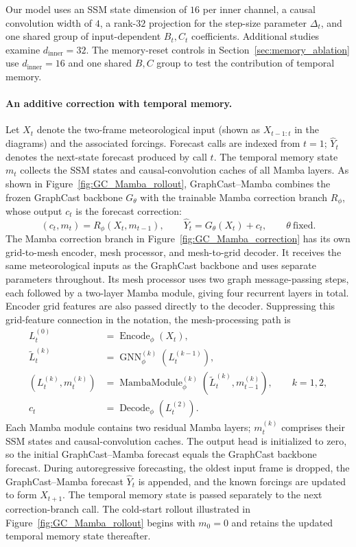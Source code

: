 \documentclass{article}
\begin{document}
Our model uses an SSM state dimension of $16$ per inner channel, a causal convolution width of $4$, a rank-$32$ projection for the step-size parameter $\Delta_t$, and one shared group of input-dependent $B_t,C_t$ coefficients. Additional studies examine $d_{\mathrm{inner}}=32$. The memory-reset controls in Section~\ref{sec:memory_ablation} use $d_{\mathrm{inner}}=16$ and one shared $B,C$ group to test the contribution of temporal memory.


\paragraph{An additive correction with temporal memory.}
Let $X_t$ denote the two-frame meteorological input (shown as $X_{t-1:t}$ in the diagrams) and the associated forcings. Forecast calls are indexed from $t=1$; $\hat{Y}_t$ denotes the next-state forecast produced by call $t$. The temporal memory state $m_t$ collects the SSM states and causal-convolution caches of all Mamba layers. As shown in Figure~\ref{fig:GC_Mamba_rollout}, {GraphCast--Mamba combines the frozen GraphCast backbone $G_\theta$ with the trainable Mamba correction branch $R_\phi$, whose output $c_t$ is the forecast correction}:
\vspace{-4pt}
\begin{equation}
    (c_t,m_t)=R_\phi(X_t,m_{t-1}),
    \qquad
    \hat{Y}_t=G_\theta(X_t)+c_t,
    \qquad \theta\ \text{fixed}.
    \label{eq:additive_correction}
\end{equation}
{The Mamba correction branch in Figure~\ref{fig:GC_Mamba_correction}} has its own grid-to-mesh encoder, mesh processor, and mesh-to-grid decoder. It receives {the same meteorological inputs as the GraphCast backbone} and uses separate parameters throughout. Its mesh processor uses two graph message-passing steps, each followed by a two-layer Mamba module, giving four recurrent layers in total. Encoder grid features are also passed directly to the decoder. Suppressing this grid-feature connection in the notation, the mesh-processing path is
\begin{align}
    L_t^{(0)} &= \operatorname{Encode}_\phi(X_t),\\
    \widetilde{L}_t^{(k)} &= \operatorname{GNN}^{(k)}_\phi(L_t^{(k-1)}),\\
    (L_t^{(k)},m_t^{(k)})
    &=\operatorname{MambaModule}^{(k)}_\phi
       (\widetilde{L}_t^{(k)},m_{t-1}^{(k)}),\qquad k=1,2,\\
    c_t &= \operatorname{Decode}_\phi(L_t^{(2)}).
\end{align}
{Each Mamba module contains two residual Mamba layers; $m_t^{(k)}$ comprises their SSM states and causal-convolution caches.} The output head is initialized to zero, so {the initial GraphCast--Mamba forecast equals the GraphCast backbone forecast}. During autoregressive forecasting, the oldest input frame is dropped, {the GraphCast--Mamba forecast $\hat{Y}_t$ is appended}, and the known forcings are updated to form $X_{t+1}$. {The temporal memory state is passed separately to the next correction-branch call.} The cold-start rollout illustrated in Figure~\ref{fig:GC_Mamba_rollout} begins with $m_0=0$ and {retains the updated temporal memory state thereafter}.
\end{document}
